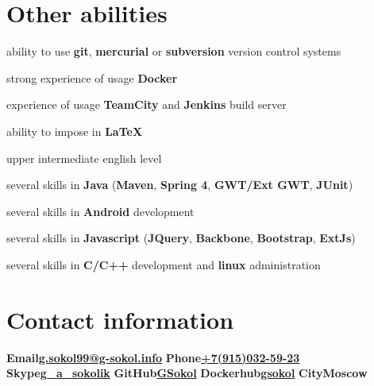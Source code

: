 \documentclass[9pt, a4paper, english]{extarticle}
\begin{document}
\section* {Other abilities}
\begin {list}{\textbullet}{\itemsep=0mm}
  \item ability to use \textbf{git}, \textbf{mercurial} or \textbf{subversion} version control systems
  \item strong experience of usage \textbf{Docker}
  \item experience of usage \textbf{TeamCity} and \textbf{Jenkins} build server
  \item ability to impose in \textbf{LaTeX}
  \item upper intermediate english level
  \item several skills in \textbf{Java} (\textbf{Maven}, \textbf{Spring 4}, \textbf{GWT/Ext GWT}, \textbf{JUnit})
  \item several skills in \textbf{Android} development
  \item several skills in \textbf{Javascript} (\textbf{JQuery}, \textbf{Backbone}, \textbf{Bootstrap}, \textbf{ExtJs})
  \item several skills in \textbf{C/C++} development and \textbf{linux} administration
\end {list}


\section* {Contact information}
\textbf{Email}\textbf{\href{mailto:g.sokol99@g-sokol.info}{g.sokol99@g-sokol.info}}\newline
\textbf{Phone}\textbf{\href{tel:+7(915)032-59-23}{+7(915)032-59-23}}\newline
\textbf{Skype}\textbf{\href{skype:g\_a\_sokolik?call}{g\_a\_sokolik}}\newline
\textbf{GitHub}\textbf{\href{https://github.com/GSokol}{GSokol}}\newline
\textbf{Dockerhub}\textbf{\href{https://hub.docker.com/u/gsokol/}{gsokol}}\newline
\textbf{City}\textbf{Moscow}
\end{document}
